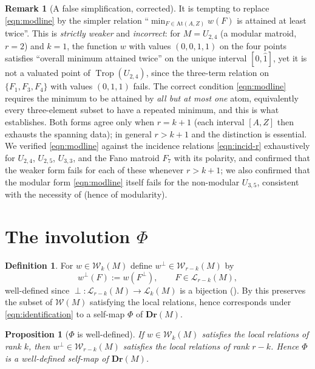 \documentclass{article}
\newtheorem{proposition}[theorem]{Proposition}
\theoremstyle{definition}
\newtheorem{definition}[theorem]{Definition}
\newtheorem{remark}[theorem]{Remark}
\newcommand{\Trop}{\operatorname{Trop}}
\newcommand{\Dr}{\mathbf{Dr}}
\newcommand{\cLL}{\mathcal{L}}
\newcommand{\cW}{\mathcal{W}}
\begin{document}
\begin{remark}[A false simplification, corrected]\label{rmk:false-E2}
It is tempting to replace \eqref{eqn:modline} by the simpler relation ``$\min_{F\in\mathrm{At}(A,Z)}
w(F)$ is attained at least twice''. This is \emph{strictly weaker} and \emph{incorrect}: for
$M=U_{2,4}$ (a modular matroid, $r=2$) and $k=1$, the function $w$ with values $(0,0,1,1)$ on the four
points satisfies ``overall minimum attained twice'' on the unique interval $[\hat0,\hat1]$, yet it is
not a valuated point of $\Trop(U_{2,4})$, since the three-term relation on $\{F_1,F_3,F_4\}$ with
values $(0,1,1)$ fails. The correct condition \eqref{eqn:modline} requires the minimum to be attained
by \emph{all but at most one} atom, equivalently every three-element subset to have a repeated
minimum, and this is what  establishes. Both forms agree only when $r=k+1$ (each
interval $[A,Z]$ then exhausts the spanning data); in general $r>k+1$ and the distinction is
essential. We verified \eqref{eqn:modline} against the incidence relations \eqref{eqn:incid-r}
exhaustively for $U_{2,4}$, $U_{2,5}$, $U_{3,3}$, and the Fano matroid $F_7$ with its polarity, and
confirmed that the weaker form fails for each of these whenever $r>k+1$; we also confirmed that the
modular form \eqref{eqn:modline} itself fails for the non-modular $U_{3,5}$, consistent with the
necessity of  (hence of modularity).
\end{remark}

\section{The involution \texorpdfstring{$\Phi$}{Phi}}

\begin{definition}\label{def:Phi}
For $w\in\cW_k(M)$ define $w^{\perp}\in\cW_{r-k}(M)$ by
\begin{equation}\label{eqn:Phi-flat}
  w^{\perp}(F):=w(F^{\perp}),\qquad F\in\cLL_{r-k}(M),
\end{equation}
well-defined since $\perp\colon\cLL_{r-k}(M)\to\cLL_k(M)$ is a bijection (). By
 this preserves the subset of $\cW(M)$ satisfying the local relations, hence corresponds
under \eqref{eqn:identification} to a self-map $\Phi$ of $\Dr(M)$.
\end{definition}

\begin{proposition}[$\Phi$ is well-defined]\label{prop:wd}
If $w\in\cW_k(M)$ satisfies the local relations of rank $k$, then $w^{\perp}\in\cW_{r-k}(M)$ satisfies
the local relations of rank $r-k$. Hence $\Phi$ is a well-defined self-map of $\Dr(M)$.
\end{proposition}
\end{document}
